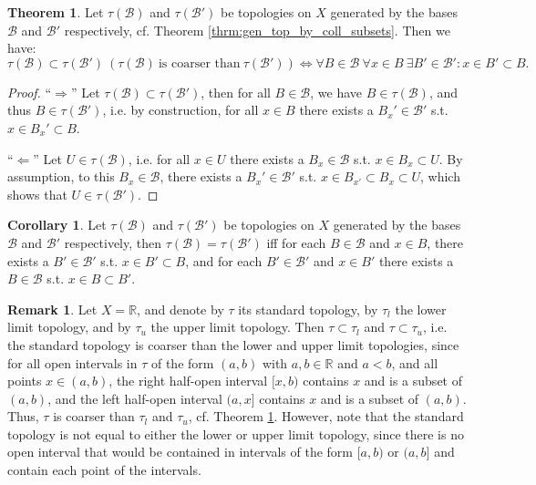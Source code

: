 \documentclass[12pt, a4paper]{article}
\numberwithin{equation}{section}
\theoremstyle{definition}
\theoremstyle{definition}
\newtheorem{remark}[thm]{Remark} %
\newtheorem{theorem}[thm]{Theorem}
\newtheorem{corollary}[thm]{Corollary}
\begin{document}
		\begin{theorem}\label{thrm:comp_topologies_bases}
			Let $\tau(\mathscr B)$ and $\tau(\mathscr B')$ be topologies on $X$ generated by the bases $\mathscr B$ and $\mathscr B'$ respectively, cf. Theorem \ref{thrm:gen_top_by_coll_subsets}. Then we have:
			$$\tau(\mathscr B)\subset \tau(\mathscr B') \ (\tau(\mathscr B)\ \text{is coarser than}\ \tau(\mathscr B')) \Leftrightarrow \forall B\in\mathscr B\ \forall x\in B\ \exists B'\in\mathscr B': x\in B'\subset B.$$
		\end{theorem}
		
		\begin{proof}
			\enquote{$\Longrightarrow$} Let $\tau(\mathscr B)\subset \tau(\mathscr B')$, then for all $B\in\mathscr B$, we have $B\in\tau(\mathscr B)$, and thus $B\in \tau(\mathscr B')$, i.e. by construction, for all $x\in B$ there exists a $B_x'\in\mathscr B'$ s.t. $x\in B_x'\subset B$.
			
			\enquote{$\Longleftarrow$} Let $U\in\tau(\mathscr B)$, i.e. for all $x\in U$ there exists a $B_x\in \mathscr B$ s.t. $x\in B_x\subset U$. By assumption, to this $B_x\in\mathscr B$, there exists a $B_x'\in\mathscr B'$ s.t. $x\in B_{x'} \subset B_x\subset U$, which shows that $U\in\tau(\mathscr B')$.
		\end{proof} 
		
		\begin{corollary}\label{corollary:equality_of_topologies}
			Let $\tau(\mathscr B)$ and $\tau(\mathscr B')$ be topologies on $X$ generated by the bases $\mathscr B$ and $\mathscr B'$ respectively, then $\tau(\mathscr B) = \tau(\mathscr B')$ iff for each $B\in \mathscr B$ and $x\in B$, there exists a $B'\in\mathscr B'$ s.t. $x\in B'\subset B$, and for each $B'\in \mathscr B'$ and $x\in B'$ there exists a $B\in\mathscr B$ s.t. $x\in B\subset B'$.
		\end{corollary}
	
		\begin{remark}
			Let $X = \mathbb R$, and denote by $\tau$ its standard topology, by $\tau_l$ the lower limit topology, and by $\tau_u$ the upper limit topology. Then $\tau\subset \tau_l$ and $\tau\subset \tau_u$, i.e. the standard topology is coarser than the lower and upper limit topologies, since for all open intervals in $\tau$ of the form $(a, b)$ with $a, b\in\mathbb R$ and $a < b$, and all points $x\in (a, b)$, the right half-open interval $[x, b)$ contains $x$ and is a subset of $(a, b)$, and the left half-open interval $(a, x]$ contains $x$ and is a subset of $(a, b)$. Thus, $\tau$ is coarser than $\tau_l$ and $\tau_u$, cf. Theorem \ref{thrm:comp_topologies_bases}. However, note that the standard topology is not equal to either the lower or upper limit topology, since there is no open interval that would be contained in intervals of the form $[a, b)$ or $(a, b]$ and contain each point of the intervals.
		\end{remark}
	
\end{document}
